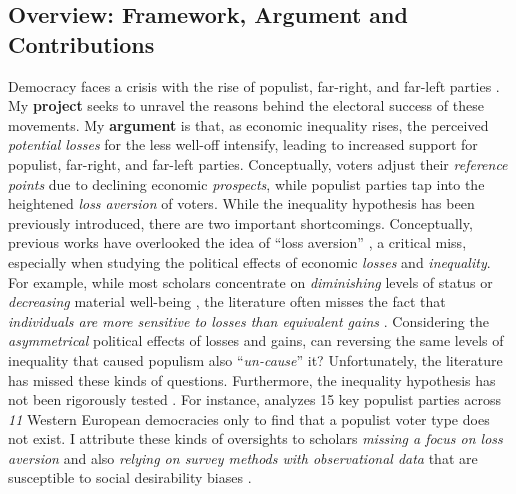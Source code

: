 \documentclass[letterpaper]{article}
\begin{document}
\vspace{-10mm}

\subsection*{Overview: Framework, Argument and Contributions}

Democracy faces a crisis with the rise of populist, far-right, and far-left parties \parencite{Mudde2004,Coffe2007a}. My {\bf project} seeks to unravel the reasons behind the electoral success of these movements. My {\bf argument} is that, as economic inequality rises, the perceived \emph{potential losses} for the less well-off intensify, leading to increased support for populist, far-right, and far-left parties. Conceptually, voters adjust their \emph{reference points} due to declining economic \emph{prospects}, while populist parties tap into the heightened \emph{loss aversion} of voters. While the inequality hypothesis has been previously introduced, there are two important shortcomings. Conceptually, previous works have overlooked the idea of ``loss aversion'' \parencite{Kahneman1979}, a critical miss, especially when studying the political effects of economic \emph{losses} and \emph{inequality}. For example, while most scholars concentrate on \emph{diminishing} levels of status \parencite{Gidron2017a} or \emph{decreasing} material well-being \parencite{Oesch2008a}, the literature often misses the fact that \emph{individuals are more sensitive to losses than equivalent gains} \parencite[p. 171]{Levy1992a}. Considering the \emph{asymmetrical} political effects of losses and gains, can reversing the same levels of inequality that caused populism also ``\emph{un-cause}'' it? Unfortunately, the literature has missed these kinds of questions. Furthermore, the inequality hypothesis has not been rigorously tested \parencite[p. 154]{Engler2021}. For instance, \textcite{Rooduijn2018b} analyzes 15 key populist parties across \emph{11} Western European democracies only to find that a populist voter type does not exist. I attribute these kinds of oversights to scholars \emph{missing a focus on loss aversion} and also \emph{relying on survey methods with observational data} that are susceptible to social desirability biases \parencite{Kuklinski1997}. 
\end{document}
